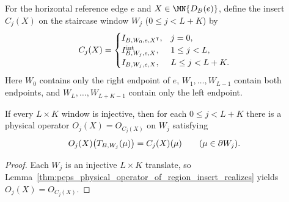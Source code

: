 \begin{definition}%
    \label{def:peps_staircase_virtual_operation_insert}
    \leanok
    For the horizontal reference edge $e$ and $X\in\MN{D_B(e)}$, define the
    insert $C_j(X)$ on the staircase window $W_j$ ($0\le j<L+K$) by
    \begin{align}
        C_j(X)
         & =
        \begin{cases}
            I_{B,W_0,e,X^{\mathsf T}},    & j=0,        \\
            I^{\mathrm{int}}_{B,W_j,e,X}, & 1\le j<L,   \\
            I_{B,W_j,e,X},                & L\le j<L+K.
        \end{cases}
        \notag
    \end{align}
    Here $W_0$ contains only the right endpoint of $e$, $W_1,\ldots,W_{L-1}$
    contain both endpoints, and $W_L,\ldots,W_{L+K-1}$ contain only the left
    endpoint.
\end{definition}

\begin{lemma}%
    \label{thm:peps_staircase_virtual_operation_physical_realization}
    \leanok
    If every $L\times K$ window is injective, then for each $0\leq j<L+K$ there
    is a physical operator $O_j(X)=O_{C_j(X)}$ on $W_j$ satisfying
    \begin{align}
        O_j(X)\bigl(T_{B,W_j}(\mu)\bigr) & =C_j(X)(\mu)
        \qquad (\mu\in\partial W_j).
        \notag
    \end{align}
\end{lemma}
\begin{proof}
    \leanok
    Each $W_j$ is an injective $L\times K$ translate, so
    Lemma~\ref{thm:peps_physical_operator_of_region_insert_realizes} yields
    $O_j(X)=O_{C_j(X)}$.
\end{proof}

